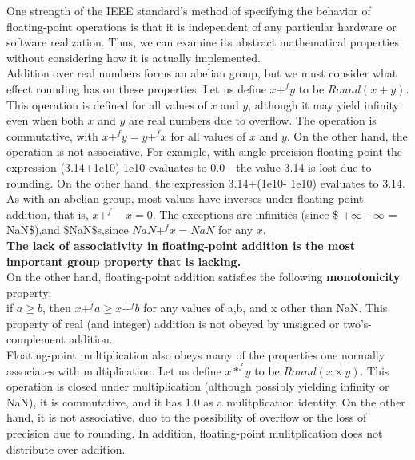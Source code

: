 \documentclass[11pt]{article}
\begin{document}
One strength of the IEEE standard’s method of specifying the behavior of floating-point operations is that it is independent of any particular hardware or software realization. Thus, we can examine its abstract mathematical properties without considering how it is actually implemented.\\


Addition over real numbers forms an abelian group, but we must consider what effect rounding has on these properties. Let us define \(x +^f y\) to be \(Round(x + y)\). This operation is defined for all values of \(x\) and \(y\), although it may yield infinity even when both \(x\) and \(y\) are real numbers due to overflow. The operation is commutative, with \(x +^f y = y +^f x\) for all values of \(x\) and \(y\). On the other hand, the operation is not associative. For example, with single-precision floating point the expression (3.14+1e10)-1e10 evaluates to 0.0—the value 3.14 is lost due to rounding. On the other hand, the expression 3.14+(1e10- 1e10) evaluates to 3.14. As with an abelian group, most values have inverses under floating-point addition, that is, \(x +^f −x = 0\). The exceptions are infinities (since \$ +\(\infty\) - \(\infty\) = NaN\$),and \$NaN\$s,since \(NaN +^f x = NaN\) for any \(x\).\\

\textbf{The lack of associativity in floating-point addition is the most important group property that is lacking.}\\

On the other hand, floating-point addition satisfies the following \textbf{monotonicity} property:\\
if \(a \ge b\), then \(x +^f a \ge x +^f b\) for any values of a,b, and x other than NaN. This property of real (and integer) addition is not obeyed by unsigned or two’s-complement addition.\\



Floating-point multiplication also obeys many of the properties one normally associates with multiplication. Let us define \(x *^f y\) to be \(Round(x \times y)\). This operation is closed under multiplication (although possibly yielding infinity or NaN), it is commutative, and it has 1.0 as a mulitplication identity. On the other hand, it is not associative, duo to the possibility of overflow or the loss of precision due to rounding. In addition, floating-point mulitplication does not distribute over addition.\\
\end{document}
